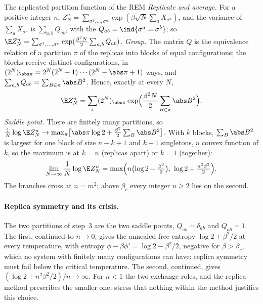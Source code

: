 \begin{refsection}
\begin{computation}{The replicated partition function of the REM}\label{comp:rem:replicas}
\step \emph{Replicate and average.} For a positive integer $n$, $Z_N^n=\sum_{\sigma^1,\dots,\sigma^n}\exp(\beta\sqrt N\sum_{a}X_{\sigma^a})$, and the variance of $\sum_aX_{\sigma^a}$ is $\sum_{a,b}Q_{ab}$, with the  $Q_{ab}=\ind\{\sigma^a=\sigma^b\}$; so $\E Z_N^n=\sum_{\sigma^1,\dots,\sigma^n}\exp(\frac{\beta^2N}2\sum_{a,b}Q_{ab})$.
\step \emph{Group.} The matrix $Q$ is the equivalence relation of a partition $\pi$ of the replicas into blocks of equal configurations; the blocks receive distinct configurations, in $(2^N)_{\abs\pi}=2^N(2^N-1)\cdots(2^N-\abs\pi+1)$ ways, and $\sum_{a,b}Q_{ab}=\sum_{B\in\pi}\abs B^2$. Hence, exactly at every $N$,
\begin{equation}\label{eq:rem:replicated}
\E Z_N^n=\sum_\pi(2^N)_{\abs\pi}\exp\Bigl(\frac{\beta^2N}2\sum_{B\in\pi}\abs B^2\Bigr).
\end{equation}
\step \emph{Saddle point.} There are finitely many partitions, so $\frac1N\log\E Z_N^n\to\max_\pi\bigl[\abs\pi\log2+\frac{\beta^2}2\sum_B\abs B^2\bigr]$. With $k$ blocks, $\sum_B\abs B^2$ is largest for one block of size $n-k+1$ and $k-1$ singletons, a convex function of $k$, so the maximum is at $k=n$ (replicas apart) or $k=1$ (together):
\[
\lim_{N\to\infty}\frac1N\log\E Z_N^n=\max\Bigl(n\bigl(\log2+\tfrac{\beta^2}2\bigr),\ \log2+\tfrac{n^2\beta^2}2\Bigr).
\]
The branches cross at $n=m^2$; above $\beta_c$ every integer $n\ge2$ lies on the second.
\end{computation}

\paragraph{Replica symmetry and its crisis.} The two partitions of step~3 are the two  saddle points, $Q_{ab}=\delta_{ab}$ and $Q_{ab}=1$. The first, continued to $n\to0$, gives the annealed free entropy $\log2+\beta^2/2$ at every temperature, with entropy $\phi-\beta\phi'=\log2-\beta^2/2$, negative for $\beta>\beta_c$, which no system with finitely many configurations can have: replica symmetry must fail below the critical temperature. The second, continued, gives $(\log2+n^2\beta^2/2)/n\to\infty$. For $n<1$ the two exchange roles, and the replica method prescribes the smaller one; \textcite[ch.~8]{MezardMontanari2009} stress that nothing within the method justifies this choice.


\end{refsection}
